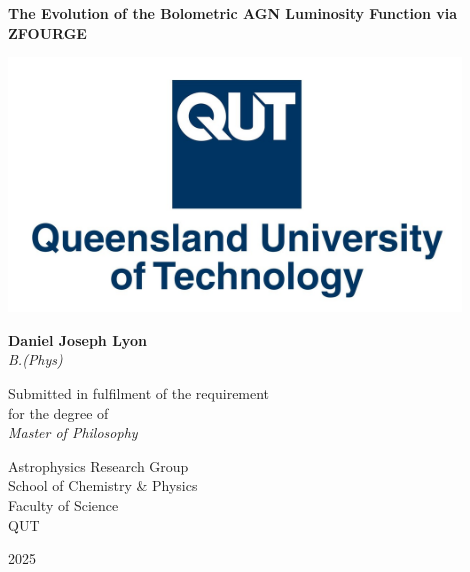 \begin{titlepage}
    \begin{center}
    
        {\huge{\textbf{The Evolution of \vspace{1mm} the Bolometric AGN Luminosity Function via ZFOURGE}}}\\
        \vspace{1.5cm}

        \includegraphics[width=12cm]{Figures/QUT Emblem.jpg}\\
        \vspace{1.5cm}

        \large{\textbf{Daniel Joseph Lyon}}\\
        \textit{B.(Phys)}\\
        \vspace{1.5cm}

        Submitted in fulfilment of the requirement \\ for the degree of\\
        \vspace{1cm}
        \textit{Master of Philosophy}\\
        \vspace{2cm}

        \small{Astrophysics Research Group}\\
        School of Chemistry \& Physics\\
        Faculty of Science\\

        \vspace{1cm}
        QUT
        \vspace{1cm}
        
        \large{2025}
            
    \end{center}
\end{titlepage}